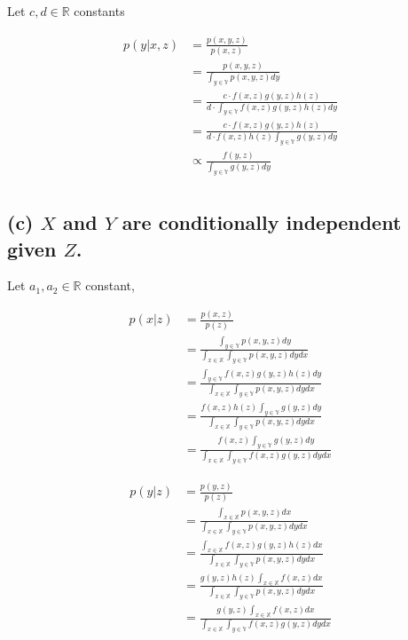 \documentclass[
  letterpaper,
  DIV=11,
  numbers=noendperiod]{scrreprt}
\begin{document}
Let \(c, d\in \mathbb{R}\) constants

\[
\begin{aligned}
    p(y|x,z) &= \frac{p(x,y,z)}{p(x,z)}\\
             &= \frac{p(x,y,z)}{\int_{y\in \mathbb{Y}}p(x,y,z)dy}\\ 
             &= \frac{c\cdot f(x,z)g(y,z)h(z)}{d\cdot \int_{y\in\mathbb{Y}} f(x,z)g(y,z)h(z)dy}\\ 
             &= \frac{c\cdot f(x,z)g(y,z)h(z)}{d\cdot f(x,z)h(z)\int_{y\in\mathbb{Y}} g(y,z)dy}\\ 
             &\propto \frac{f(y,z)}{\int_{y\in\mathbb{Y}}g(y,z)dy}\\
\end{aligned}
\]

\hypertarget{c-x-and-y-are-conditionally-independent-given-z.}{%
\subsection{\texorpdfstring{(c) \(X\) and \(Y\) are conditionally
independent given
\(Z\).}{(c) X and Y are conditionally independent given Z.}}\label{c-x-and-y-are-conditionally-independent-given-z.}}

Let \(a_1, a_2 \in \mathbb{R}\) constant,

\[
\begin{aligned}
p(x|z) &= \frac{p(x,z)}{p(z)}\\
       &= \frac{\int_{y\in\mathbb{Y}}p(x,y,z)dy}{\int_{x\in\mathbb{X}}\int_{y\in\mathbb{Y}} p(x,y,z) dydx}\\ 
       &= \frac{\int_{y\in\mathbb{Y}}f(x,z)g(y,z)h(z) dy}{\int_{x\in\mathbb{X}}\int_{y\in\mathbb{Y}} p(x,y,z) dydx}\\ 
       &= \frac{f(x,z)h(z)\int_{y\in\mathbb{Y}}g(y,z)dy}{\int_{x\in\mathbb{X}}\int_{y\in\mathbb{Y}} p(x,y,z) dydx}\\ 
       &= \frac{f(x,z)\int_{y\in\mathbb{Y}}g(y,z)dy}{\int_{x\in\mathbb{X}}\int_{y\in\mathbb{Y}} f(x,z)g(y,z) dydx}
\end{aligned}
\]

\[
\begin{aligned}
    p(y|z) &= \frac{p(y,z)}{p(z)}\\
           &=  \frac{\int_{x\in\mathbb{X}}p(x,y,z)dx}{\int_{x\in\mathbb{X}}\int_{y\in\mathbb{Y}} p(x,y,z) dydx}\\
           &= \frac{\int_{x\in \mathbb{X}} f(x,z)g(y,z)h(z) dx}{\int_{x\in\mathbb{X}}\int_{y\in\mathbb{Y}} p(x,y,z) dydx}\\ 
           &= \frac{g(y,z)h(z)\int_{x\in \mathbb{X}} f(x,z)dx}{\int_{x\in\mathbb{X}}\int_{y\in\mathbb{Y}} p(x,y,z) dydx}\\
           &= \frac{g(y,z)\int_{x\in \mathbb{X}} f(x,z)dx}{\int_{x\in\mathbb{X}}\int_{y\in\mathbb{Y}} f(x,z)g(y,z) dydx}\\
\end{aligned}
\]
\end{document}
